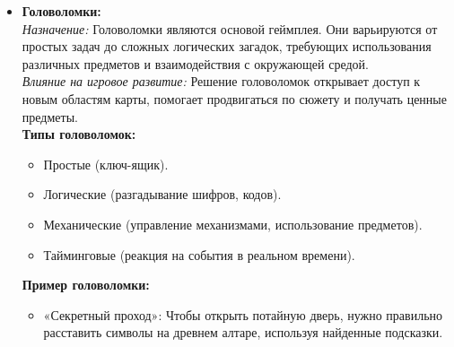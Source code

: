 \documentclass{article}
\begin{document}
\begin{itemize}
		\item \textbf{Головоломки:}  \\
		\textit{Назначение:} Головоломки являются основой геймплея. Они варьируются от простых задач до сложных логических загадок, требующих использования различных предметов и взаимодействия с окружающей средой.  \\
		\textit{Влияние на игровое развитие:} Решение головоломок открывает доступ к новым областям карты, помогает продвигаться по сюжету и получать ценные предметы.  \\
		\textbf{Типы головоломок:}  
		\begin{itemize}
			\item Простые (ключ-ящик).
			\item Логические (разгадывание шифров, кодов).
			\item Механические (управление механизмами, использование предметов).
			\item Тайминговые (реакция на события в реальном времени).
		\end{itemize}
		\textbf{Пример головоломки:}
		\begin{itemize}
			\item «Секретный проход»: Чтобы открыть потайную дверь, нужно правильно расставить символы на древнем алтаре, используя найденные подсказки.
		\end{itemize}
		

\end{itemize}
\end{document}
